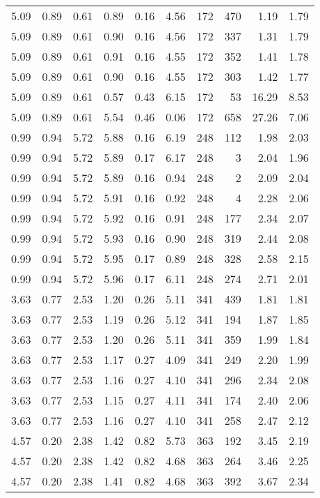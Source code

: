 \begin{longtable}{rrrrrrrrrr}
5.09	&	0.89	&	0.61	&	0.89	&	0.16	&	4.56	&	172	&	470	&	1.19	&	1.79	\\
5.09	&	0.89	&	0.61	&	0.90	&	0.16	&	4.56	&	172	&	337	&	1.31	&	1.79	\\
5.09	&	0.89	&	0.61	&	0.91	&	0.16	&	4.55	&	172	&	352	&	1.41	&	1.78	\\
5.09	&	0.89	&	0.61	&	0.90	&	0.16	&	4.55	&	172	&	303	&	1.42	&	1.77	\\
5.09	&	0.89	&	0.61	&	0.57	&	0.43	&	6.15	&	172	&	53	&	16.29	&	8.53	\\
5.09	&	0.89	&	0.61	&	5.54	&	0.46	&	0.06	&	172	&	658	&	27.26	&	7.06	\\
0.99	&	0.94	&	5.72	&	5.88	&	0.16	&	6.19	&	248	&	112	&	1.98	&	2.03	\\
0.99	&	0.94	&	5.72	&	5.89	&	0.17	&	6.17	&	248	&	3	&	2.04	&	1.96	\\
0.99	&	0.94	&	5.72	&	5.89	&	0.16	&	0.94	&	248	&	2	&	2.09	&	2.04	\\
0.99	&	0.94	&	5.72	&	5.91	&	0.16	&	0.92	&	248	&	4	&	2.28	&	2.06	\\
0.99	&	0.94	&	5.72	&	5.92	&	0.16	&	0.91	&	248	&	177	&	2.34	&	2.07	\\
0.99	&	0.94	&	5.72	&	5.93	&	0.16	&	0.90	&	248	&	319	&	2.44	&	2.08	\\
0.99	&	0.94	&	5.72	&	5.95	&	0.17	&	0.89	&	248	&	328	&	2.58	&	2.15	\\
0.99	&	0.94	&	5.72	&	5.96	&	0.17	&	6.11	&	248	&	274	&	2.71	&	2.01	\\
3.63	&	0.77	&	2.53	&	1.20	&	0.26	&	5.11	&	341	&	439	&	1.81	&	1.81	\\
3.63	&	0.77	&	2.53	&	1.19	&	0.26	&	5.12	&	341	&	194	&	1.87	&	1.85	\\
3.63	&	0.77	&	2.53	&	1.20	&	0.26	&	5.11	&	341	&	359	&	1.99	&	1.84	\\
3.63	&	0.77	&	2.53	&	1.17	&	0.27	&	4.09	&	341	&	249	&	2.20	&	1.99	\\
3.63	&	0.77	&	2.53	&	1.16	&	0.27	&	4.10	&	341	&	296	&	2.34	&	2.08	\\
3.63	&	0.77	&	2.53	&	1.15	&	0.27	&	4.11	&	341	&	174	&	2.40	&	2.06	\\
3.63	&	0.77	&	2.53	&	1.16	&	0.27	&	4.10	&	341	&	258	&	2.47	&	2.12	\\
4.57	&	0.20	&	2.38	&	1.42	&	0.82	&	5.73	&	363	&	192	&	3.45	&	2.19	\\
4.57	&	0.20	&	2.38	&	1.42	&	0.82	&	4.68	&	363	&	264	&	3.46	&	2.25	\\
4.57	&	0.20	&	2.38	&	1.41	&	0.82	&	4.68	&	363	&	392	&	3.67	&	2.34	\\

\end{longtable}

